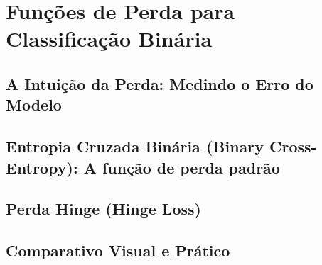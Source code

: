 
\chapter{Funções de Perda para Classificação Binária}
\label{cap:perda-binaria}

\section{A Intuição da Perda: Medindo o Erro do Modelo}

\section{Entropia Cruzada Binária (Binary Cross-Entropy): A função de perda padrão}

\section{Perda Hinge (Hinge Loss)}

\section{Comparativo Visual e Prático}
